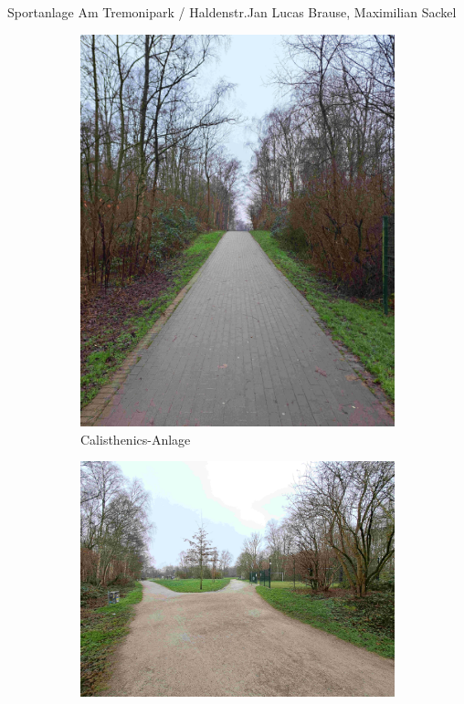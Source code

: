 \documentclass{../../templates/amendment}
\begin{document}
\begin{boxed}{Sportanlage Am Tremonipark / Haldenstr.}{Jan Lucas Brause, Maximilian Sackel}
    \begin{figure}[htpb]
        \centering
        \begin{subfigure}[]{0.3\textwidth}
            \begin{center}
                \includegraphics[width=\linewidth]{pictures/photo1.jpg}
                \caption{Calisthenics-Anlage}%
            \end{center}
        \end{subfigure}
        \begin{subfigure}{0.5\textwidth}
            \begin{center}
                \includegraphics[width=\linewidth]{pictures/photo5.jpg}

\end{center}
\end{subfigure}
\end{figure}
\end{boxed}
\end{document}

